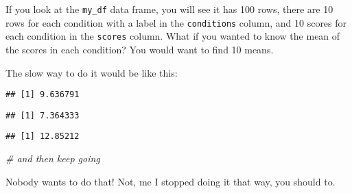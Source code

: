\documentclass[
]{book}
\newenvironment{Shaded}{\begin{snugshade}}{\end{snugshade}}
\newcommand{\CommentTok}[1]{\textcolor[rgb]{0.56,0.35,0.01}{\textit{#1}}}
\newcommand{\FunctionTok}[1]{\textcolor[rgb]{0.13,0.29,0.53}{\textbf{#1}}}
\newcommand{\NormalTok}[1]{#1}
\newcommand{\SpecialCharTok}[1]{\textcolor[rgb]{0.81,0.36,0.00}{\textbf{#1}}}
\newcommand{\StringTok}[1]{\textcolor[rgb]{0.31,0.60,0.02}{#1}}
\begin{document}
If you look at the \texttt{my\_df} data frame, you will see it has 100 rows, there are 10 rows for each condition with a label in the \texttt{conditions} column, and 10 scores for each condition in the \texttt{scores} column. What if you wanted to know the mean of the scores in each condition? You would want to find 10 means.

The slow way to do it would be like this:

\begin{Shaded}
\end{Shaded}

\begin{verbatim}
## [1] 9.636791
\end{verbatim}

\begin{Shaded}
\end{Shaded}

\begin{verbatim}
## [1] 7.364333
\end{verbatim}

\begin{Shaded}
\end{Shaded}

\begin{verbatim}
## [1] 12.85212
\end{verbatim}

\begin{Shaded}
\begin{Highlighting}[]
\CommentTok{\# and then keep going}
\end{Highlighting}
\end{Shaded}

Nobody wants to do that! Not, me I stopped doing it that way, you should to.
\end{document}
